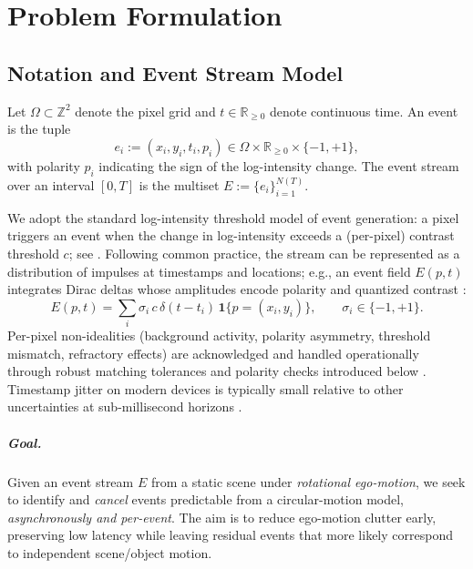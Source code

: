 \chapter{Problem Formulation}\label{chap:problem}

\section{Notation and Event Stream Model}
Let $\Omega \subset \mathbb{Z}^2$ denote the pixel grid and $t \in \mathbb{R}_{\ge 0}$ denote continuous time. An event is the tuple
\[
e_i := (x_i, y_i, t_i, p_i) \in \Omega \times \mathbb{R}_{\ge 0} \times \{-1, +1\},
\]
with polarity $p_i$ indicating the sign of the log-intensity change. The event stream over an interval $[0,T]$ is the multiset $E := \{e_i\}_{i=1}^{N(T)}$.

We adopt the standard log-intensity threshold model of event generation: a pixel triggers an event when the change in log-intensity exceeds a (per-pixel) contrast threshold $c$; see \cite{Lichtsteiner2008DVS,Brandli2014DAVIS,Posch2014Retinomorphic,Gallego2020Survey}. Following common practice, the stream can be represented as a distribution of impulses at timestamps and locations; e.g., an event field $E(p,t)$ integrates Dirac deltas whose amplitudes encode polarity and quantized contrast \cite{Scheerlinck2021Thesis,Wang2025Thesis}:
\begin{equation}
E(p,t) = \sum_{i} \sigma_i\,c\,\delta\!\left(t - t_i\right)\,\mathbf{1}\{p=(x_i,y_i)\}, \qquad \sigma_i \in \{-1,+1\}.
\label{eq:event-field}
\end{equation}
Per-pixel non-idealities (background activity, polarity asymmetry, threshold mismatch, refractory effects) are acknowledged and handled operationally through robust matching tolerances and polarity checks introduced below \cite{Brandli2014DAVIS,Delbruck2020Handbook,Gallego2020Survey}. Timestamp jitter on modern devices is typically small relative to other uncertainties at sub-millisecond horizons \cite{Wang2025Thesis}.

\paragraph{Goal.}
Given an event stream $E$ from a static scene under \emph{rotational ego-motion}, we seek to identify and \emph{cancel} events predictable from a circular-motion model, \emph{asynchronously and per-event}. The aim is to reduce ego-motion clutter early, preserving low latency while leaving residual events that more likely correspond to independent scene/object motion.

